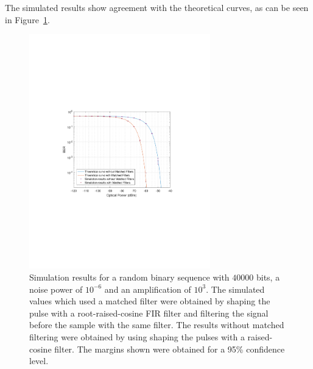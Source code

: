 The simulated results show agreement with the theoretical curves, as can be seen in Figure~\ref{fig:ber_pseudorandom}.
\begin{figure}[H]
	\centering
	\includegraphics[clip, trim=4cm 8cm 4cm 8cm, width=0.7\textwidth]{./sdf/m_qam_system/figures/teor_vs_simul.pdf}
	\caption{Simulation results for a random binary sequence with $40000$ bits, a noise power of $10^{-6}$ and an amplification of $10^3$. The simulated values which used a matched filter were obtained by shaping the pulse with a root-raised-cosine FIR filter and filtering the signal before the sample with the same filter. The results without matched filtering were obtained by using shaping the pulses with a raised-cosine filter. The margins shown were obtained for a 95\% confidence level.}
	\label{fig:ber_pseudorandom}
\end{figure}%


